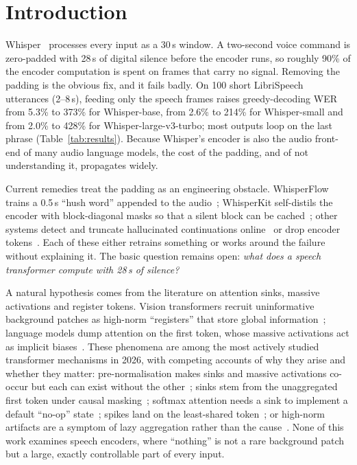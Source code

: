 \section{Introduction}
\label{sec:intro}

Whisper~\cite{radford2023whisper} processes every input as a 30\,s window. A two-second voice command is zero-padded with 28\,s of digital silence before the encoder runs, so roughly 90\% of the encoder computation is spent on frames that carry no signal. Removing the padding is the obvious fix, and it fails badly. On 100 short LibriSpeech~\cite{panayotov2015librispeech} utterances (2--8\,s), feeding only the speech frames raises greedy-decoding WER from 5.3\% to 373\% for Whisper-base, from 2.6\% to 214\% for Whisper-small and from 2.0\% to 428\% for Whisper-large-v3-turbo; most outputs loop on the last phrase (Table~\ref{tab:results}). Because Whisper's encoder is also the audio front-end of many audio language models, the cost of the padding, and of not understanding it, propagates widely.

Current remedies treat the padding as an engineering obstacle. WhisperFlow trains a 0.5\,s ``hush word'' appended to the audio~\cite{wang2024whisperflow}; WhisperKit self-distils the encoder with block-diagonal masks so that a silent block can be cached~\cite{orhon2025whisperkit}; other systems detect and truncate hallucinated continuations online~\cite{lee2026npusper} or drop encoder tokens~\cite{cho2026stridek}. Each of these either retrains something or works around the failure without explaining it. The basic question remains open: \emph{what does a speech transformer compute with 28\,s of silence?}

A natural hypothesis comes from the literature on attention sinks, massive activations and register tokens. Vision transformers recruit uninformative background patches as high-norm ``registers'' that store global information~\cite{darcet2024registers,jiang2025testtime}; language models dump attention on the first token, whose massive activations act as implicit biases~\cite{sun2024massive,xiao2024streaming}. These phenomena are among the most actively studied transformer mechanisms in 2026, with competing accounts of why they arise and whether they matter: pre-normalisation makes sinks and massive activations co-occur but each can exist without the other~\cite{sun2026anatomy}; sinks stem from the unaggregated first token under causal masking~\cite{li2026structural}; softmax attention needs a sink to implement a default ``no-op'' state~\cite{ranmilo2026necessary}; spikes land on the least-shared token~\cite{ngnawe2026spike}; or high-norm artifacts are a symptom of lazy aggregation rather than the cause~\cite{shi2026lastvit}. None of this work examines speech encoders, where ``nothing'' is not a rare background patch but a large, exactly controllable part of every input.

